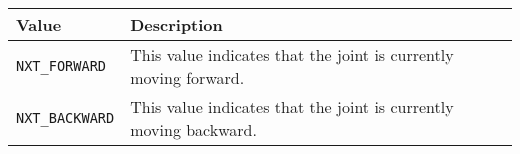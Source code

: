 \\
\noindent
\begin{tabular}{p{1.75in}p{4.5in}} \hline 
Value & Description \\
\hline 
\texttt{NXT\_FORWARD} & This value indicates that the joint is currently moving forward. \\
\texttt{NXT\_BACKWARD}& This value indicates that the joint is currently moving backward.\\
\hline
\end{tabular}\\

